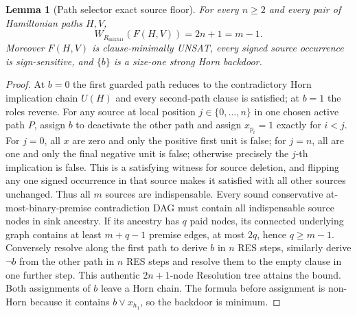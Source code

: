 \documentclass[11pt]{article}
\newtheorem{lemma}{Lemma}
\begin{document}
\begin{lemma}[Path selector exact source floor]
For \emph{every} $n\ge2$ and every pair of Hamiltonian paths $H,V$,
\[
\boxed{W_{R_{\mathrm{mix341}}}(F(H,V))=2n+1=m-1.}
\]
Moreover $F(H,V)$ is clause-minimally UNSAT, every signed source occurrence is sign-sensitive, and $\{b\}$ is a size-one strong Horn backdoor.
\end{lemma}
\begin{proof}
At $b=0$ the first guarded path reduces to the contradictory Horn implication chain $U(H)$ and every second-path clause is satisfied; at $b=1$ the roles reverse. For any source at local position $j\in\{0,\ldots,n\}$ in one chosen active path $P$, assign $b$ to deactivate the other path and assign $x_{p_i}=1$ exactly for $i<j$. For $j=0$, all $x$ are zero and only the positive first unit is false; for $j=n$, all are one and only the final negative unit is false; otherwise precisely the $j$-th implication is false. This is a satisfying witness for source deletion, and flipping any one signed occurrence in that source makes it satisfied with all other sources unchanged. Thus all $m$ sources are indispensable.
Every sound conservative at-most-binary-premise contradiction DAG must contain all indispensable source nodes in sink ancestry. If its ancestry has $q$ paid nodes, its connected underlying graph contains at least $m+q-1$ premise edges, at most $2q$, hence $q\ge m-1$. Conversely resolve along the first path to derive $b$ in $n$ RES steps, similarly derive $\neg b$ from the other path in $n$ RES steps and resolve them to the empty clause in one further step. This authentic $2n+1$-node Resolution tree attains the bound. Both assignments of $b$ leave a Horn chain. The formula before assignment is non-Horn because it contains $b\lor x_{h_1}$, so the backdoor is minimum.
\end{proof}
\end{document}
